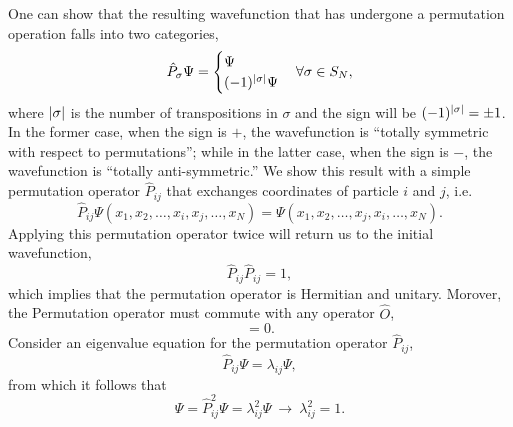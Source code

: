     One can show that the resulting wavefunction that has undergone a permutation operation 
    falls into two categories,
    \begin{equation}
        \hat{P}_\sigma\Psi = 
        \begin{cases}
            \Psi &\\
            (-1)^{\abs{\sigma}}\Psi& 
        \end{cases} \forall \sigma \in S_N,
    \end{equation}
    where $\abs{\sigma}$ is the number of transpositions in $\sigma$ and the sign 
    will be $(-1)^{\abs{\sigma}} = \pm 1$. In the former case, when the sign is $+$,
    the wavefunction is ``totally symmetric with respect to permutations''; while in 
    the latter case, when the sign is $-$, the wavefunction is ``totally anti-symmetric.''
    We show this result with a simple permutation operator $\hat{P}_{ij}$ that exchanges 
    coordinates of particle $i$ and $j$, i.e.
    \begin{equation}
        \hat{P}_{ij}\Psi(x_1, x_2, \dots, x_i, x_j, \dots, x_N)
        =  \Psi(x_1, x_2, \dots, x_j, x_i, \dots, x_N).
    \end{equation}
    Applying this permutation operator twice will return us to the initial wavefunction,
    \begin{equation}
        \hat{P}_{ij} \hat{P}_{ij} = 1,
    \end{equation}
    which implies that the permutation operator is Hermitian and unitary. Morover, the 
    Permutation operator must commute with any operator $\hat{O}$,
    \begin{equation}
        [\hat{P}_{ij}, \hat{O}] = 0.
    \end{equation}
    Consider an eigenvalue equation for the permutation operator $\hat{P}_{ij}$,
    \begin{equation}
        \hat{P}_{ij}\Psi = \lambda_{ij}\Psi,
    \end{equation}
    from which it follows that 
    \begin{equation}
        \Psi = \hat{P}_{ij}^2 \Psi = \lambda_{ij}^2\Psi\ \to \  \lambda_{ij}^2 = 1.
    \end{equation}

